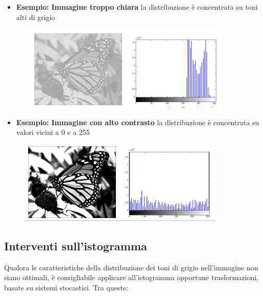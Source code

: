 \begin{itemize}
    \item \textbf{Esempio:} \textbf{Immagine troppo chiara}
          la distribuzione è concentrata su toni alti di grigio
\end{itemize}

\begin{figure}[H]
    \centering
    \includegraphics[width=\linewidth, keepaspectratio]{capitoli/immagini/imgs/isto-chiaro.png}
\end{figure}

\begin{itemize}
    \item \textbf{Esempio:} \textbf{Immagine con alto contrasto}
          la distribuzione è concentrata su valori vicini a 0 e a 255
\end{itemize}

\begin{figure}[H]
    \centering
    \includegraphics[width=\linewidth, keepaspectratio]{capitoli/immagini/imgs/alto-c.png}
\end{figure}

\subsection{Interventi sull’istogramma}
Qualora le caratteristiche della distribuzione dei toni di grigio nell’immagine non siano ottimali, è consigliabile applicare
all’istogramma opportune trasformazioni, basate su sistemi stocastici.
Tra queste:

